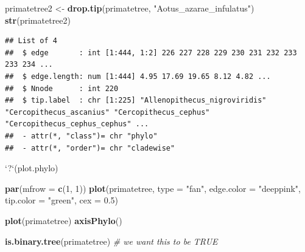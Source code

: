 \documentclass[]{article}
\newenvironment{Shaded}{\begin{snugshade}}{\end{snugshade}}
\newcommand{\KeywordTok}[1]{\textcolor[rgb]{0.13,0.29,0.53}{\textbf{{#1}}}}
\newcommand{\DataTypeTok}[1]{\textcolor[rgb]{0.13,0.29,0.53}{{#1}}}
\newcommand{\DecValTok}[1]{\textcolor[rgb]{0.00,0.00,0.81}{{#1}}}
\newcommand{\FloatTok}[1]{\textcolor[rgb]{0.00,0.00,0.81}{{#1}}}
\newcommand{\StringTok}[1]{\textcolor[rgb]{0.31,0.60,0.02}{{#1}}}
\newcommand{\CommentTok}[1]{\textcolor[rgb]{0.56,0.35,0.01}{\textit{{#1}}}}
\newcommand{\NormalTok}[1]{{#1}}
\begin{document}
\begin{Shaded}
\begin{Highlighting}[]
\NormalTok{primatetree2 <-}\StringTok{ }\KeywordTok{drop.tip}\NormalTok{(primatetree, }\StringTok{"Aotus_azarae_infulatus"}\NormalTok{)}
\KeywordTok{str}\NormalTok{(primatetree2)}
\end{Highlighting}
\end{Shaded}

\begin{verbatim}
## List of 4
##  $ edge       : int [1:444, 1:2] 226 227 228 229 230 231 232 233 233 234 ...
##  $ edge.length: num [1:444] 4.95 17.69 19.65 8.12 4.82 ...
##  $ Nnode      : int 220
##  $ tip.label  : chr [1:225] "Allenopithecus_nigroviridis" "Cercopithecus_ascanius" "Cercopithecus_cephus" "Cercopithecus_cephus_cephus" ...
##  - attr(*, "class")= chr "phylo"
##  - attr(*, "order")= chr "cladewise"
\end{verbatim}

\begin{Shaded}
\begin{Highlighting}[]
\StringTok{`}\DataTypeTok{?}\StringTok{`}\NormalTok{(plot.phylo)}
\end{Highlighting}
\end{Shaded}

\begin{Shaded}
\begin{Highlighting}[]
\KeywordTok{par}\NormalTok{(}\DataTypeTok{mfrow =} \KeywordTok{c}\NormalTok{(}\DecValTok{1}\NormalTok{, }\DecValTok{1}\NormalTok{))}
\KeywordTok{plot}\NormalTok{(primatetree, }\DataTypeTok{type =} \StringTok{"fan"}\NormalTok{, }\DataTypeTok{edge.color =} \StringTok{"deeppink"}\NormalTok{, }\DataTypeTok{tip.color =} \StringTok{"green"}\NormalTok{, }
    \DataTypeTok{cex =} \FloatTok{0.5}\NormalTok{)}
\end{Highlighting}
\end{Shaded}

\begin{Shaded}
\begin{Highlighting}[]
\KeywordTok{plot}\NormalTok{(primatetree)}
\KeywordTok{axisPhylo}\NormalTok{()}
\end{Highlighting}
\end{Shaded}

\begin{Shaded}
\begin{Highlighting}[]
\KeywordTok{is.binary.tree}\NormalTok{(primatetree)  }\CommentTok{# we want this to be TRUE}
\end{Highlighting}
\end{Shaded}
\end{document}
